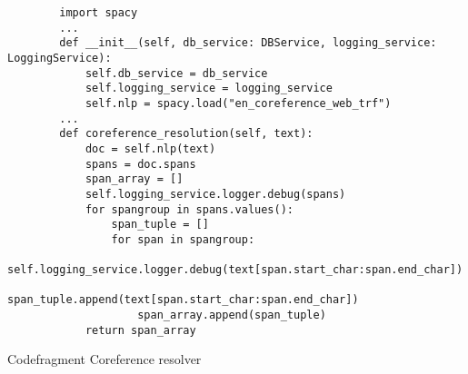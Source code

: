 \begin{listing}
    \begin{verbatim}
        import spacy
        ...
        def __init__(self, db_service: DBService, logging_service: LoggingService):
            self.db_service = db_service
            self.logging_service = logging_service
            self.nlp = spacy.load("en_coreference_web_trf")
        ...
        def coreference_resolution(self, text):
            doc = self.nlp(text)
            spans = doc.spans
            span_array = []
            self.logging_service.logger.debug(spans)
            for spangroup in spans.values():
                span_tuple = []
                for span in spangroup:
                    self.logging_service.logger.debug(text[span.start_char:span.end_char])
                    span_tuple.append(text[span.start_char:span.end_char])
                    span_array.append(span_tuple)
            return span_array
    \end{verbatim}
    \caption[Coreference resolver]{Codefragment Coreference resolver}
    \label{code:coreference}
\end{listing}
